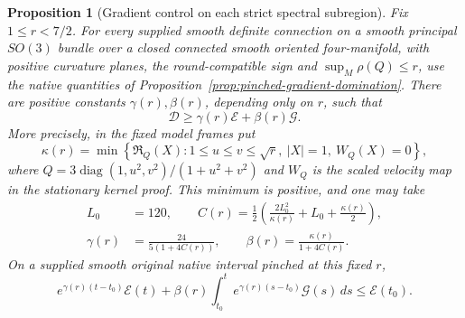 \documentclass[11pt]{article}
\numberwithin{equation}{section}
\newtheorem{proposition}[theorem]{Proposition}
\theoremstyle{definition}
\theoremstyle{remark}
\begin{document}
\begin{proposition}[Gradient control on each strict spectral subregion]
\label{prop:strict-spectral-gradient}
Fix \(1\le r<7/2\). For every supplied smooth definite connection on a smooth
principal $SO(3)$ bundle over a closed connected smooth
oriented four-manifold, with positive curvature planes,
the round-compatible sign and $\sup_M\rho(Q)\le r$,
use the native quantities of
Proposition~\ref{prop:pinched-gradient-domination}.
There are positive constants
\(\gamma(r),\beta(r)\), depending only on \(r\), such that
\begin{equation}\label{eq:strict-spectral-gradient}
 \mathscr D\ge\gamma(r)\mathscr E+\beta(r)\mathscr G.
\end{equation}
More precisely, in the fixed model frames put
\[
 \kappa(r)=\min\left\{\mathfrak R_Q(X):
  1\le u\le v\le\sqrt r,\ |X|=1,\ W_Q(X)=0\right\},
\]
where \(Q=3\operatorname{diag}(1,u^2,v^2)/(1+u^2+v^2)\)
and \(W_Q\) is the scaled velocity map in the stationary
kernel proof. This minimum is positive, and one may take
\begin{equation}\label{eq:strict-spectral-constants}
 \begin{split}
 L_0&=120,\qquad
 C(r)=\tfrac12\left(\frac{2L_0^2}{\kappa(r)}+L_0+
                                  \frac{\kappa(r)}2\right),\\
 \gamma(r)&=\frac{24}{5(1+4C(r))},\qquad
 \beta(r)=\frac{\kappa(r)}{1+4C(r)}.
 \end{split}
\end{equation}
On a supplied smooth original native interval pinched at
this fixed \(r\),
\[
 e^{\gamma(r)(t-t_0)}\mathscr E(t)+
 \beta(r)\int_{t_0}^t e^{\gamma(r)(s-t_0)}\mathscr G(s)\,ds
 \le\mathscr E(t_0).
\]
\end{proposition}
\end{document}
